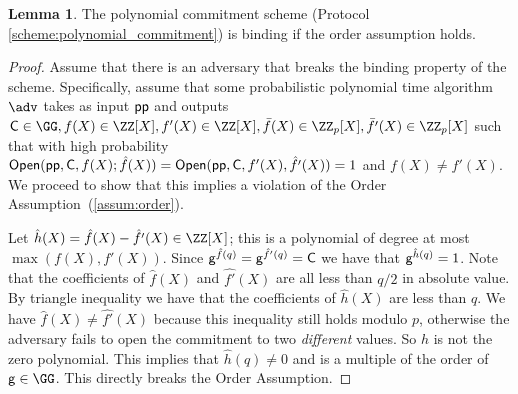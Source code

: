 \documentclass{article}
\theoremstyle{definition}
\newtheorem{lemma}{Lemma}
\begin{document}
\begin{lemma}
	The polynomial commitment scheme (Protocol \ref{scheme:polynomial_commitment}) is binding if the order assumption holds.
\end{lemma}
\begin{proof}
    Assume that there is an adversary that breaks the binding property of the scheme. Specifically, assume that some probabilistic polynomial time algorithm $\adv$ takes as input $\textsf{pp}$ and outputs $\gr{C} \in \GG, f(X) \in \ZZ[X], f'(X)\in \ZZ[X], \bar{f}(X)\in \ZZ_p[X], \bar{f'}(X) \in \ZZ_p[X]$ such that with high probability $\textsf{{Open}}(\textsf{pp}, \mathsf{C}, f(X); \hat{f}(X)) = \textsf{{Open}}(\textsf{pp}, \mathsf{C}, f'(X), \hat{f'}(X)) = 1$ and $f(X) \neq f'(X)$. We proceed to show that this implies a violation of the Order Assumption~(\ref{assum:order}).
    
	Let $\hat{h}(X)=\hat{f}(X)-\hat{f'}(X) \in \ZZ[X]$; this is a polynomial of degree at most $\max(f(X), f'(X))$. Since $\mathsf{g}^{\hat{f}(q)}=\mathsf{g}^{\hat{f'}(q)}=\mathsf{C}$ we have that $\mathsf{g}^{\hat{h}(q)}=1$. Note that the coefficients of $\hat{f}(X)$ and $\hat{f'}(X)$ are all less than $q/2$ in absolute value. By triangle inequality we have that the coefficients of $\hat{h}(X)$ are less than $q$. We have $\hat{f}(X) \neq \hat{f'}(X)$ because this inequality still holds modulo $p$, otherwise the adversary fails to open the commitment to two \emph{different} values. So $\hat{h}$ is not the zero polynomial. This implies that $\hat{h}(q) \neq 0$ and is a multiple of the order of $\gr{g} \in \GG$. This directly breaks the Order Assumption.
\end{proof}
\end{document}

